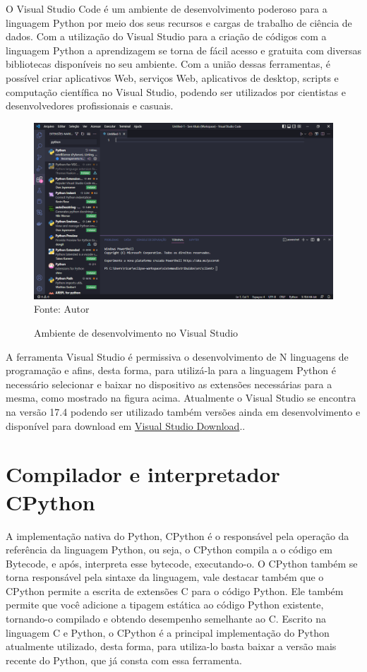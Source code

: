 O Visual Studio Code é um ambiente de desenvolvimento poderoso para a linguagem Python por meio dos seus recursos e cargas de trabalho de ciência de dados. Com a utilização do Visual Studio para a criação de códigos com a linguagem Python a aprendizagem se torna de fácil acesso e gratuita com diversas bibliotecas disponíveis no seu ambiente. Com a união dessas ferramentas, é possível criar aplicativos Web, serviços Web, aplicativos de desktop, scripts e computação científica no Visual Studio, podendo ser utilizados por cientistas e desenvolvedores profissionais e casuais.\\
  \begin{figure}[H]
	\begin{center}
		\caption{Ambiente de desenvolvimento no Visual Studio} \label{ling1}
		\includegraphics[width=15cm]{visualStudioPy.PNG} \\
		{\tiny \sf Fonte:{ Autor}}
	\end{center}
\end{figure}
A ferramenta Visual Studio é permissiva o desenvolvimento de N linguagens de programação e afins, desta forma, para utilizá-la para a linguagem Python é necessário selecionar e baixar no dispositivo as extensões necessárias para a mesma, como mostrado na figura acima. Atualmente o Visual Studio se encontra na versão 17.4 podendo ser utilizado também versões ainda em desenvolvimento e disponível para download em \href{https://visualstudio.microsoft.com/pt-br/downloads/}{Visual Studio Download}..

    \section{Compilador e interpretador CPython}

A implementação nativa do Python, CPython é o responsável pela operação da referência da linguagem Python, ou seja, o CPython compila a o código em Bytecode, e após, interpreta esse bytecode, executando-o. O CPython também se torna responsável pela sintaxe da linguagem, vale destacar também que o CPython permite a escrita de extensões C para o código Python. Ele também permite que você adicione a tipagem estática ao código Python existente, tornando-o compilado e obtendo desempenho semelhante ao C. Escrito na linguagem C e Python, o CPython é a principal implementação do Python atualmente utilizado, desta forma, para utiliza-lo basta baixar a versão mais recente do Python, que já consta com essa ferramenta. 


